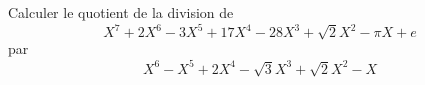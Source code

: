 Calculer le quotient de la division de
\begin{displaymath}
X^7 + 2X^6 - 3X^5 + 17X^4 - 28X^3 + \sqrt{2}X^2 -\pi X + e
\end{displaymath}
par
\begin{displaymath}
X^6 -X^5 + 2X^4 - \sqrt{3}X^3 + \sqrt{2}X^2 - X
\end{displaymath}
\bigskip
